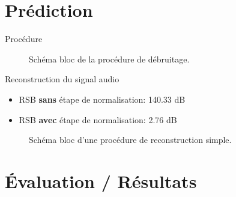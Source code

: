 \documentclass{beamer}
\begin{document}
\section{Prédiction}


\begin{frame}{Procédure}
\begin{figure}
    \centering
    \resizebox{\linewidth}{!}{%
        
    }
    \captionsetup{justification=centering,margin=0cm}
    \caption{Schéma bloc de la procédure de débruitage.}
    \label{fig:block_prediction}
\end{figure}
\end{frame}



\begin{frame}{Reconstruction du signal audio}
\begin{itemize}
    \item RSB \textbf{sans} étape de normalisation:  140.33 dB
    \item RSB \textbf{avec} étape de normalisation:  2.76 dB
\end{itemize}

\begin{figure}
    \centering
    \resizebox{\linewidth}{!}{%
        
    }
    \captionsetup{justification=centering,margin=0cm}
    \caption{Schéma bloc d'une procédure de reconstruction simple.}
    \label{fig:block_probleme_reocnstruction}
\end{figure}
\end{frame}










\section{\'Evaluation / Résultats}
\end{document}
